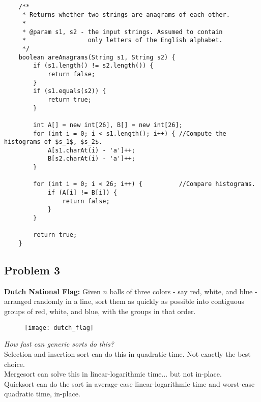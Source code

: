 \begin{verbatim}
    
    /**
     * Returns whether two strings are anagrams of each other.
     *
     * @param s1, s2 - the input strings. Assumed to contain
     *                 only letters of the English alphabet.
     */
    boolean areAnagrams(String s1, String s2) {
        if (s1.length() != s2.length()) {
            return false;
        }
        if (s1.equals(s2)) {
            return true;
        }

        int A[] = new int[26], B[] = new int[26];
        for (int i = 0; i < s1.length(); i++) { //Compute the histograms of $s_1$, $s_2$.
            A[s1.charAt(i) - 'a']++;
            B[s2.charAt(i) - 'a']++;
        }

        for (int i = 0; i < 26; i++) {          //Compare histograms.
            if (A[i] != B[i]) {
                return false;
            }
        }

        return true;
    }

\end{verbatim}
\mbox{}\vspace{20pt}
\subsection*{Problem 3}

\textbf{Dutch National Flag: } Given $n$ balls of three colors - say red, white, and blue - arranged randomly in a line, sort them as quickly as possible into contiguous groups of red, white, and blue, with the groups in that order.\\

\begin{figure}[h]
    \centering
    \texttt{[image: dutch\_flag]}
\end{figure}

\textit{How fast can generic sorts do this?}\\

Selection and insertion sort can do this in quadratic time. Not exactly the best choice.\\

Mergesort can solve this in linear-logarithmic time... but not in-place.\\

Quicksort can do the sort in average-case linear-logarithmic time and worst-case quadratic time, in-place.\\

